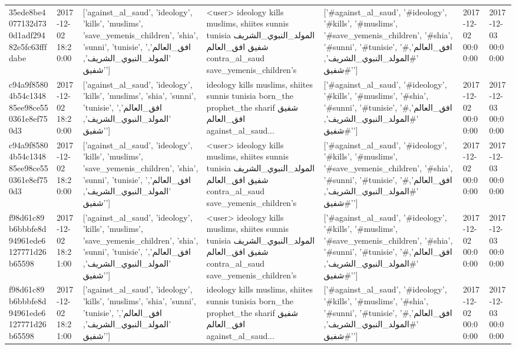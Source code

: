 \begin{tabular}{lllllll}
35ede8be4077132d730d1adf29482e5fc63fffdabe & 2017-12-02 18:20:00 & ['against_al_saud', 'ideology', 'kills', 'muslims', 'save_yemenis_children', 'shia', 'sunni', 'tunisie', 'افق_العالم', 'المولد_النبوي_الشريف', 'شفيق'] & <user> ideology kills muslims, shiites sunnis tunisia المولد\_النبوي\_الشريف شفيق افق\_العالم contra\_al\_saud save\_yemenis\_children's & ['#against_al_saud', '#ideology', '#kills', '#muslims', '#save_yemenis_children', '#shia', '#sunni', '#tunisie', '#افق_العالم', '#المولد_النبوي_الشريف', '#شفيق'] & 2017-12-02 00:00:00 & 2017-12-03 00:00:00 \\
c94a9f85804b54c134885ee98ce550361e8ef750d3 & 2017-12-02 18:20:00 & ['against_al_saud', 'ideology', 'kills', 'muslims', 'shia', 'sunni', 'tunisie', 'افق_العالم', 'المولد_النبوي_الشريف', 'شفيق'] & ideology kills muslims, shiites sunnis tunisia born\_the prophet\_the sharif شفيق افق\_العالم against\_al\_saud... & ['#against_al_saud', '#ideology', '#kills', '#muslims', '#shia', '#sunni', '#tunisie', '#افق_العالم', '#المولد_النبوي_الشريف', '#شفيق'] & 2017-12-02 00:00:00 & 2017-12-03 00:00:00 \\
c94a9f85804b54c134885ee98ce550361e8ef750d3 & 2017-12-02 18:20:00 & ['against_al_saud', 'ideology', 'kills', 'muslims', 'save_yemenis_children', 'shia', 'sunni', 'tunisie', 'افق_العالم', 'المولد_النبوي_الشريف', 'شفيق'] & <user> ideology kills muslims, shiites sunnis tunisia المولد\_النبوي\_الشريف شفيق افق\_العالم contra\_al\_saud save\_yemenis\_children's & ['#against_al_saud', '#ideology', '#kills', '#muslims', '#save_yemenis_children', '#shia', '#sunni', '#tunisie', '#افق_العالم', '#المولد_النبوي_الشريف', '#شفيق'] & 2017-12-02 00:00:00 & 2017-12-03 00:00:00 \\
f98d61c89b6bbbfe8d94961ede6127771d26b65598 & 2017-12-02 18:21:00 & ['against_al_saud', 'ideology', 'kills', 'muslims', 'save_yemenis_children', 'shia', 'sunni', 'tunisie', 'افق_العالم', 'المولد_النبوي_الشريف', 'شفيق'] & <user> ideology kills muslims, shiites sunnis tunisia المولد\_النبوي\_الشريف شفيق افق\_العالم contra\_al\_saud save\_yemenis\_children's & ['#against_al_saud', '#ideology', '#kills', '#muslims', '#save_yemenis_children', '#shia', '#sunni', '#tunisie', '#افق_العالم', '#المولد_النبوي_الشريف', '#شفيق'] & 2017-12-02 00:00:00 & 2017-12-03 00:00:00 \\
f98d61c89b6bbbfe8d94961ede6127771d26b65598 & 2017-12-02 18:21:00 & ['against_al_saud', 'ideology', 'kills', 'muslims', 'shia', 'sunni', 'tunisie', 'افق_العالم', 'المولد_النبوي_الشريف', 'شفيق'] & ideology kills muslims, shiites sunnis tunisia born\_the prophet\_the sharif شفيق افق\_العالم against\_al\_saud... & ['#against_al_saud', '#ideology', '#kills', '#muslims', '#shia', '#sunni', '#tunisie', '#افق_العالم', '#المولد_النبوي_الشريف', '#شفيق'] & 2017-12-02 00:00:00 & 2017-12-03 00:00:00 \\

\end{tabular}

